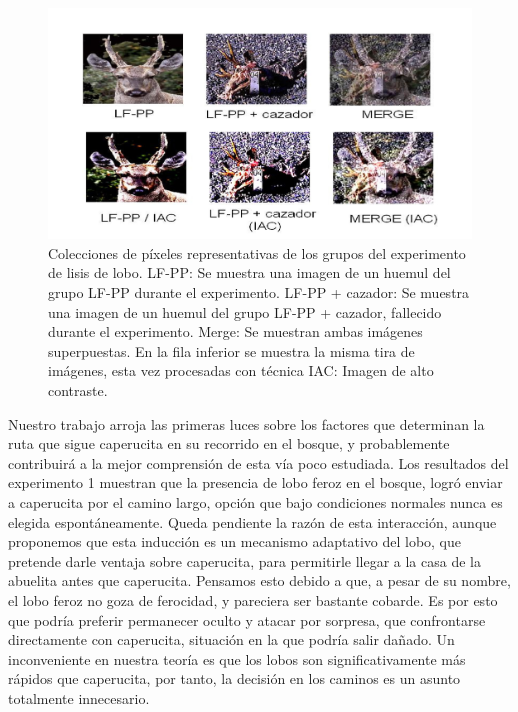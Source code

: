 \documentclass[fleqn,10pt]{AmateCodex} %
\begin{document}
\begin{figure}[ht]\centering %
\includegraphics[width=\linewidth]{imagenes/Caperucita-Fig03.png}
\caption{Colecciones de píxeles representativas de los grupos del experimento de lisis de lobo. LF-PP: Se muestra una imagen de un huemul del grupo LF-PP durante el experimento. LF-PP + cazador: Se muestra una imagen de un huemul del grupo LF-PP + cazador, fallecido durante el experimento. Merge: Se muestran ambas imágenes superpuestas. En la fila inferior se muestra la misma tira de imágenes, esta vez procesadas con técnica IAC: Imagen de alto contraste.}
\label{fig:Caperucita-Fig03}
\end{figure}

Nuestro trabajo arroja las primeras luces sobre los
factores que determinan la ruta que sigue caperucita
en su recorrido en el bosque, y probablemente
contribuirá a la mejor comprensión de esta vía poco
estudiada. Los resultados del experimento 1
muestran que la presencia de lobo feroz en el
bosque, logró enviar a caperucita por el camino
largo, opción que bajo condiciones normales nunca
es elegida espontáneamente. Queda pendiente la
razón de esta interacción, aunque proponemos que
esta inducción es un mecanismo adaptativo del lobo,
que pretende darle ventaja sobre caperucita, para
permitirle llegar a la casa de la abuelita antes que
caperucita. Pensamos esto debido a que, a pesar de
su nombre, el lobo feroz no goza de ferocidad, y
pareciera ser bastante cobarde. Es por esto que
podría preferir permanecer oculto y atacar por
sorpresa, que confrontarse directamente con
caperucita, situación en la que podría salir dañado.
Un inconveniente en nuestra teoría es que los lobos
son significativamente más rápidos que caperucita,
por tanto, la decisión en los caminos es un asunto
totalmente innecesario.
\end{document}
